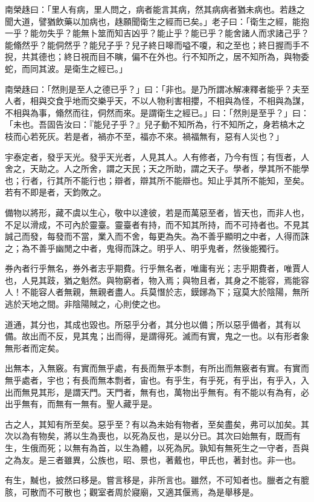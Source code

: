 \begin{pinyinscope}
南榮趎曰：「里人有病，里人問之，病者能言其病，然其病病者猶未病也。若趎之聞大道，譬猶飲藥以加病也，趎願聞衛生之經而已矣。」老子曰：「衛生之經，能抱一乎？能勿失乎？能無卜筮而知吉凶乎？能止乎？能已乎？能舍諸人而求諸己乎？能翛然乎？能侗然乎？能兒子乎？兒子終日嗥而嗌不嗄，和之至也；終日握而手不掜，共其德也；終日視而目不瞚，偏不在外也。行不知所之，居不知所為，與物委蛇，而同其波。是衛生之經已。」

南榮趎曰：「然則是至人之德已乎？」曰：「非也。是乃所謂冰解凍釋者能乎？夫至人者，相與交食乎地而交樂乎天，不以人物利害相攖，不相與為怪，不相與為謀，不相與為事，翛然而往，侗然而來。是謂衛生之經已。」曰：「然則是至乎？」曰：「未也。吾固告汝曰：『能兒子乎？』兒子動不知所為，行不知所之，身若槁木之枝而心若死灰。若是者，禍亦不至，福亦不來。禍福無有，惡有人災也？」

宇泰定者，發乎天光。發乎天光者，人見其人。人有修者，乃今有恆；有恆者，人舍之，天助之。人之所舍，謂之天民；天之所助，謂之天子。學者，學其所不能學也；行者，行其所不能行也；辯者，辯其所不能辯也。知止乎其所不能知，至矣。若有不即是者，天鈞敗之。

備物以將形，藏不虞以生心，敬中以達彼，若是而萬惡至者，皆天也，而非人也，不足以滑成，不可內於靈臺。靈臺者有持，而不知其所持，而不可持者也。不見其誠己而發，每發而不當，業入而不舍，每更為失。為不善乎顯明之中者，人得而誅之；為不善乎幽閒之中者，鬼得而誅之。明乎人、明乎鬼者，然後能獨行。

券內者行乎無名，券外者志乎期費。行乎無名者，唯庸有光；志乎期費者，唯賈人也，人見其跂，猶之魁然。與物窮者，物入焉；與物且者，其身之不能容，焉能容人！不能容人者無親，無親者盡人。兵莫憯於志，鏌鋣為下；寇莫大於陰陽，無所逃於天地之間。非陰陽賊之，心則使之也。

道通，其分也，其成也毀也。所惡乎分者，其分也以備；所以惡乎備者，其有以備。故出而不反，見其鬼；出而得，是謂得死。滅而有實，鬼之一也。以有形者象無形者而定矣。

出無本，入無竅。有實而無乎處，有長而無乎本剽，有所出而無竅者有實。有實而無乎處者，宇也；有長而無本剽者，宙也。有乎生，有乎死，有乎出，有乎入，入出而無見其形，是謂天門。天門者，無有也，萬物出乎無有。有不能以有為有，必出乎無有，而無有一無有。聖人藏乎是。

古之人，其知有所至矣。惡乎至？有以為未始有物者，至矣盡矣，弗可以加矣。其次以為有物矣，將以生為喪也，以死為反也，是以分已。其次曰始無有，既而有生，生俄而死；以無有為首，以生為體，以死為尻。孰知有無死生之一守者，吾與之為友。是三者雖異，公族也，昭、景也，著戴也，甲氏也，著封也。非一也。

有生，黬也，披然曰移是。嘗言移是，非所言也。雖然，不可知者也。臘者之有膍胲，可散而不可散也；觀室者周於寢廟，又適其偃焉，為是舉移是。


\end{pinyinscope}
